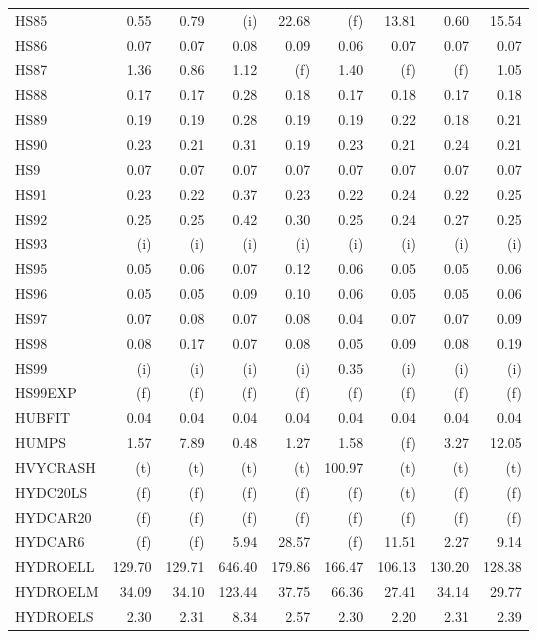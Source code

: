 \documentclass[11pt,twoside]{article}
\begin{document}
{\begin{longtable}[c]{|l|r|r|r|r|r|r|r|r|}
HS85 & 0.55 & 0.79 & (i) & 22.68 & (f) & 13.81 & 0.60 & 15.54 \\
HS86 & 0.07 & 0.07 & 0.08 & 0.09 & 0.06 & 0.07 & 0.07 & 0.07 \\
HS87 & 1.36 & 0.86 & 1.12 & (f) & 1.40 & (f) & (f) & 1.05 \\
HS88 & 0.17 & 0.17 & 0.28 & 0.18 & 0.17 & 0.18 & 0.17 & 0.18 \\
HS89 & 0.19 & 0.19 & 0.28 & 0.19 & 0.19 & 0.22 & 0.18 & 0.21 \\
HS90 & 0.23 & 0.21 & 0.31 & 0.19 & 0.23 & 0.21 & 0.24 & 0.21 \\
HS9 & 0.07 & 0.07 & 0.07 & 0.07 & 0.07 & 0.07 & 0.07 & 0.07 \\
HS91 & 0.23 & 0.22 & 0.37 & 0.23 & 0.22 & 0.24 & 0.22 & 0.25 \\
HS92 & 0.25 & 0.25 & 0.42 & 0.30 & 0.25 & 0.24 & 0.27 & 0.25 \\
HS93 & (i) & (i) & (i) & (i) & (i) & (i) & (i) & (i) \\
HS95 & 0.05 & 0.06 & 0.07 & 0.12 & 0.06 & 0.05 & 0.05 & 0.06 \\
HS96 & 0.05 & 0.05 & 0.09 & 0.10 & 0.06 & 0.05 & 0.05 & 0.06 \\
HS97 & 0.07 & 0.08 & 0.07 & 0.08 & 0.04 & 0.07 & 0.07 & 0.09 \\
HS98 & 0.08 & 0.17 & 0.07 & 0.08 & 0.05 & 0.09 & 0.08 & 0.19 \\
HS99 & (i) & (i) & (i) & (i) & 0.35 & (i) & (i) & (i) \\
HS99EXP & (f) & (f) & (f) & (f) & (f) & (f) & (f) & (f) \\
HUBFIT & 0.04 & 0.04 & 0.04 & 0.04 & 0.04 & 0.04 & 0.04 & 0.04 \\
HUMPS & 1.57 & 7.89 & 0.48 & 1.27 & 1.58 & (f) & 3.27 & 12.05 \\
HVYCRASH & (t) & (t) & (t) & (t) & 100.97 & (t) & (t) & (t) \\
HYDC20LS & (f) & (f) & (f) & (f) & (f) & (t) & (f) & (f) \\
HYDCAR20 & (f) & (f) & (f) & (f) & (f) & (f) & (f) & (f) \\
HYDCAR6 & (f) & (f) & 5.94 & 28.57 & (f) & 11.51 & 2.27 & 9.14 \\
HYDROELL & 129.70 & 129.71 & 646.40 & 179.86 & 166.47 & 106.13 & 130.20 & 128.38 \\
HYDROELM & 34.09 & 34.10 & 123.44 & 37.75 & 66.36 & 27.41 & 34.14 & 29.77 \\
HYDROELS & 2.30 & 2.31 & 8.34 & 2.57 & 2.30 & 2.20 & 2.31 & 2.39 \\

\end{longtable}}
\end{document}
